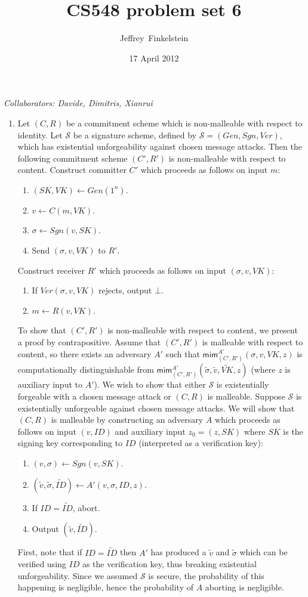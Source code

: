 \documentclass[draft]{article}
\author{Jef{}frey~Finkelstein}
\date{17 April 2012}
\title{CS548 problem set 6}
\newcommand{\collaborators}[1]{\emph{Collaborators: #1}}
\newcommand{\mim}{\mathsf{mim}}
\begin{document}
\maketitle
\collaborators{Davide, Dimitris, Xianrui}
\begin{enumerate}
\item
  Let $(C, R)$ be a commitment scheme which is non-malleable with respect to identity.
  Let $\mathcal{S}$ be a signature scheme, defined by $\mathcal{S}=(Gen, Sgn, Ver)$, which has existential unforgeability against chosen message attacks.
  Then the following commitment scheme $(C', R')$ is non-malleable with respect to content.
  Construct committer $C'$ which proceeds as follows on input $m$:
  \begin{enumerate}
  \item $(SK, VK) \gets Gen(1^n)$.
  \item $v\gets C(m, VK)$.
  \item $\sigma\gets Sgn(v, SK)$.
  \item Send $(\sigma, v, VK)$ to $R'$.
  \end{enumerate}
  Construct receiver $R'$ which proceeds as follows on input $(\sigma, v, VK)$:
  \begin{enumerate}
  \item If $Ver(\sigma, v, VK)$ rejects, output $\bot$.
  \item $m\gets R(v, VK)$.
  \end{enumerate}

  To show that $(C', R')$ is non-malleable with respect to content, we present a proof by contrapositive.
  Assume that $(C', R')$ is malleable with respect to content, so there exists an adversary $A'$ such that $\mim^{A'}_{(C', R')}(\sigma, v, VK, z)$ is computationally distinguishable from $\mim^{A'}_{(C', R')}(\tilde{\sigma}, \tilde{v}, \tilde{VK}, z)$ (where $z$ is auxiliary input to $A'$).
  We wish to show that either $\mathcal{S}$ is existentially forgeable with a chosen message attack or $(C, R)$ is malleable.
  Suppose $\mathcal{S}$ is existentially unforgeable against chosen message attacks.
  We will show that $(C, R)$ is malleable by constructing an adversary $A$ which proceeds as follows on input $(v, ID)$ and auxiliary input $z_0=(z, SK)$ where $SK$ is the signing key corresponding to $ID$ (interpreted as a verification key):
  \begin{enumerate}
  \item $(v, \sigma)\gets Sgn(v, SK)$.
  \item $(\tilde{v}, \tilde{\sigma}, \tilde{ID})\gets A'(v, \sigma, ID, z)$.
  \item If $ID=\tilde{ID}$, abort.
  \item Output $(\tilde{v}, \tilde{ID})$.
  \end{enumerate}
  First, note that if $ID=\tilde{ID}$ then $A'$ has produced a $\tilde{v}$ and $\tilde{\sigma}$ which can be verified using $ID$ as the verification key, thus breaking existential unforgeability.
  Since we assumed $\mathcal{S}$ is secure, the probability of this happening is negligible, hence the probability of $A$ aborting is negligible.


\end{enumerate}
\end{document}
